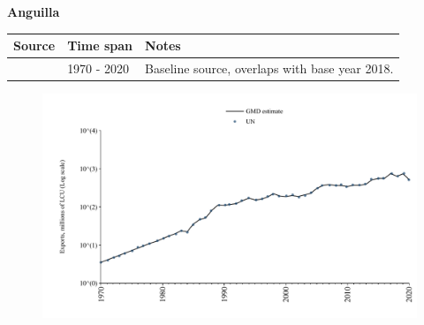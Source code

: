 \documentclass[12pt,a4paper,landscape]{article}
\begin{document}
\begin{adjustbox}{max totalsize={\paperwidth}{\paperheight},center}
\begin{minipage}[t][\textheight][t]{\textwidth}
\vspace*{0.5cm}
{}
\begin{center}
{\Large\bfseries Anguilla}
\end{center}
\vspace{0.5cm}
\begin{table}[H]
\centering
\small
\begin{tabular}{|l|l|l|}
\hline
\textbf{Source} & \textbf{Time span} & \textbf{Notes} \\
\hline
\rowcolor{white}\cite{UN}& 1970 - 2020 &Baseline source, overlaps with base year 2018.\\
\hline
\end{tabular}
\end{table}
\begin{figure}[H]
\centering
\includegraphics[width=\textwidth,height=0.6\textheight,keepaspectratio]{graphs/AIA_exports.pdf}
\end{figure}
\end{minipage}
\end{adjustbox}
\end{document}
